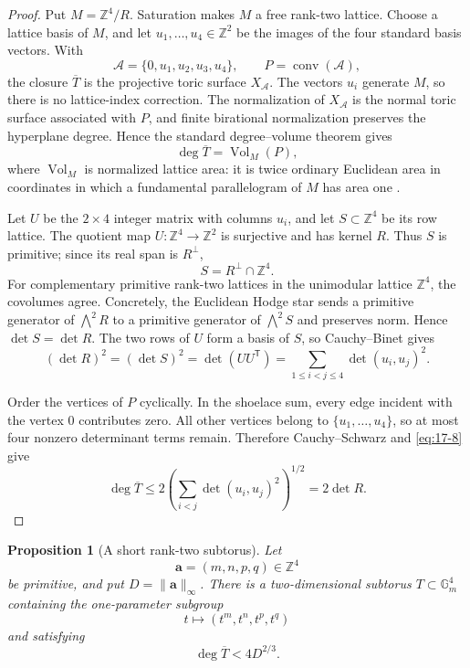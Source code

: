 \documentclass[11pt]{article}
\numberwithin{equation}{section}
\newtheorem{proposition}[theorem]{Proposition}
\theoremstyle{definition}
\newcommand{\Z}{\mathbb Z}
\begin{document}
\begin{proof}
Put \(M=\Z^4/R\).  Saturation makes \(M\) a free rank-two lattice.  Choose
a lattice basis of \(M\), and let \(u_1,\ldots,u_4\in\Z^2\) be the images
of the four standard basis vectors.  With
\[
 \mathcal A=\{0,u_1,u_2,u_3,u_4\},
 \qquad
 P=\operatorname{conv}(\mathcal A),
\]
the closure \(\overline T\) is the projective toric surface
\(X_{\mathcal A}\).  The vectors \(u_i\) generate \(M\), so there is no
lattice-index correction.  The normalization of \(X_{\mathcal A}\) is the
normal toric surface associated with \(P\), and finite birational
normalization preserves the hyperplane degree.  Hence the standard
degree--volume theorem gives
\[
 \deg\overline T=\operatorname{Vol}_M(P),
\]
where \(\operatorname{Vol}_M\) is normalized lattice area: it is twice
ordinary Euclidean area in coordinates in which a fundamental
parallelogram of \(M\) has area one
\cite[Theorems~3.A.5 and~13.4.3]{CoxLittleSchenck2011}.

Let \(U\) be the \(2\times4\) integer matrix with columns \(u_i\), and let
\(S\subset\Z^4\) be its row lattice.  The quotient map
\(U:\Z^4\to\Z^2\) is surjective and has kernel \(R\).  Thus \(S\) is
primitive; since its real span is \(R^\perp\),
\[
 S=R^\perp\cap\Z^4.
\]
For complementary primitive rank-two lattices in the unimodular lattice
\(\Z^4\), the covolumes agree.  Concretely, the Euclidean Hodge star sends
a primitive generator of \(\bigwedge^2R\) to a primitive generator of
\(\bigwedge^2S\) and preserves norm.  Hence \(\det S=\det R\).  The two
rows of \(U\) form a basis of \(S\), so Cauchy--Binet gives
\begin{equation}
 (\det R)^2=(\det S)^2=\det(UU^{\mathsf T})
 =\sum_{1\leq i<j\leq4}\det(u_i,u_j)^2.
 \label{eq:17-8}
\end{equation}

Order the vertices of \(P\) cyclically.  In the shoelace sum, every edge
incident with the vertex \(0\) contributes zero.  All other vertices belong
to \(\{u_1,\ldots,u_4\}\), so at most four nonzero determinant terms
remain.  Therefore Cauchy--Schwarz and \eqref{eq:17-8} give
\[
 \deg\overline T
 \leq2\left(\sum_{i<j}\det(u_i,u_j)^2\right)^{1/2}
 =2\det R.
\]
\end{proof}

\begin{proposition}[A short rank-two subtorus]\label{prop:shorttorus}
Let
\[
 \boldsymbol a=(m,n,p,q)\in\Z^4
\]
be primitive, and put \(D=\|\boldsymbol a\|_\infty\).  There is a
two-dimensional subtorus \(T\subset\mathbb G_m^4\) containing the
one-parameter subgroup
\[
 t\longmapsto(t^m,t^n,t^p,t^q)
\]
and satisfying
\begin{equation}
 \deg\overline T<4D^{2/3}.
 \label{eq:17-9}
\end{equation}
\end{proposition}
\end{document}
